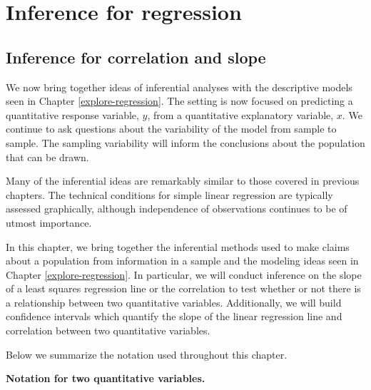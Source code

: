 \documentclass[
  10pt,
  openany]{book}
\theoremstyle{definition}
\theoremstyle{definition}
\theoremstyle{definition}
\theoremstyle{definition}
\theoremstyle{remark}
\begin{document}
\part{Inference for regression}\label{part-inference-for-regression}

\chapter{Inference for correlation and slope}\label{inference-reg}

We now bring together ideas of inferential analyses with the descriptive models seen in Chapter \ref{explore-regression}. The setting is now focused on predicting a quantitative response variable, \(y\), from a quantitative explanatory variable, \(x\). We continue to ask questions about the variability of the model from sample to sample. The sampling variability will inform the conclusions about the population that can be drawn.

Many of the inferential ideas are remarkably similar to those covered in previous chapters. The technical conditions for simple linear regression are typically assessed graphically, although independence of observations continues to be of utmost importance.

In this chapter, we bring together the inferential methods used to make claims about a population from information in a sample and the modeling ideas seen in Chapter \ref{explore-regression}.
In particular, we will conduct inference on the slope of a least squares regression line or the correlation to test whether or not there is a relationship between two quantitative variables.
Additionally, we will build confidence intervals which quantify the slope of the linear regression line and correlation between two quantitative variables.

Below we summarize the notation used throughout this chapter.

\textbf{Notation for two quantitative variables.}
\end{document}
